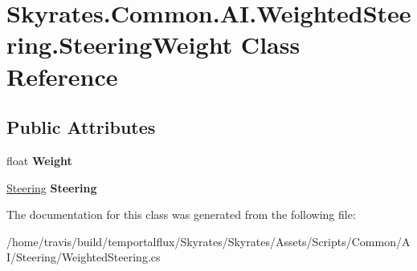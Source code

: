 \hypertarget{class_skyrates_1_1_common_1_1_a_i_1_1_weighted_steering_1_1_steering_weight}{\section{Skyrates.\-Common.\-A\-I.\-Weighted\-Steering.\-Steering\-Weight Class Reference}
\label{class_skyrates_1_1_common_1_1_a_i_1_1_weighted_steering_1_1_steering_weight}
}
\subsection*{Public Attributes}
\begin{DoxyCompactItemize}
\item 
\hypertarget{class_skyrates_1_1_common_1_1_a_i_1_1_weighted_steering_1_1_steering_weight_ac91f19027e41cfc30c7a0abe302412c2}{float {\bfseries Weight}}\label{class_skyrates_1_1_common_1_1_a_i_1_1_weighted_steering_1_1_steering_weight_ac91f19027e41cfc30c7a0abe302412c2}

\item 
\hypertarget{class_skyrates_1_1_common_1_1_a_i_1_1_weighted_steering_1_1_steering_weight_a1231c36d72cb41fcaed1843679c2f6ec}{\hyperlink{class_skyrates_1_1_common_1_1_a_i_1_1_steering}{Steering} {\bfseries Steering}}\label{class_skyrates_1_1_common_1_1_a_i_1_1_weighted_steering_1_1_steering_weight_a1231c36d72cb41fcaed1843679c2f6ec}

\end{DoxyCompactItemize}


The documentation for this class was generated from the following file\-:\begin{DoxyCompactItemize}
\item 
/home/travis/build/temportalflux/\-Skyrates/\-Skyrates/\-Assets/\-Scripts/\-Common/\-A\-I/\-Steering/Weighted\-Steering.\-cs\end{DoxyCompactItemize}
